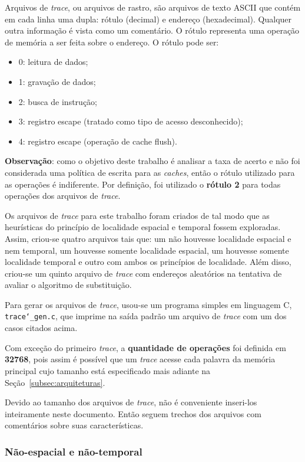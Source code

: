 Arquivos de \textit{trace}, ou arquivos de rastro, são arquivos de texto ASCII que contém em cada linha uma dupla: rótulo (decimal) e endereço (hexadecimal). Qualquer outra informação é vista como um comentário. O rótulo representa uma operação de memória a ser feita sobre o endereço. O rótulo pode ser:
\begin{itemize}[noitemsep]
	\item 0: leitura de dados;
	\item 1: gravação de dados;
	\item 2: busca de instrução;
	\item 3: registro escape (tratado como tipo de acesso desconhecido);
	\item 4: registro escape (operação de cache flush).
\end{itemize}

\textbf{Observação}: como o objetivo deste trabalho é analisar a taxa de acerto e não foi considerada uma política de escrita para as \textit{caches}, então o rótulo utilizado para as operações é indiferente. Por definição, foi utilizado o \textbf{rótulo 2} para todas operações dos arquivos de \textit{trace}.

Os arquivos de \textit{trace} para este trabalho foram criados de tal modo que as heurísticas do princípio de localidade espacial e temporal fossem exploradas. Assim, criou-se quatro arquivos tais que: um não houvesse localidade espacial e nem temporal, um houvesse somente localidade espacial, um houvesse somente localidade temporal e outro com ambos os princípios de localidade. Além disso, criou-se um quinto arquivo de \textit{trace} com endereços aleatórios na tentativa de avaliar o algoritmo de substituição.

Para gerar os arquivos de \textit{trace}, usou-se um programa simples em linguagem C, \texttt{trace\char`_gen.c}, que imprime na saída padrão um arquivo de \textit{trace} com um dos casos citados acima.

Com exceção do primeiro \textit{trace}, a \textbf{quantidade de operações} foi definida em \textbf{32768}, pois assim é possível que um \textit{trace} acesse cada palavra da memória principal cujo tamanho está especificado mais adiante na Seção~\ref{subsec:arquiteturas}.

Devido ao tamanho dos arquivos de \textit{trace}, não é conveniente inseri-los inteiramente neste documento. Então seguem trechos dos arquivos com comentários sobre suas características.

\subsubsection{Não-espacial e não-temporal}

